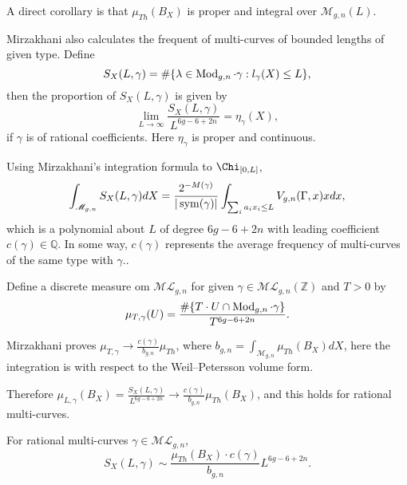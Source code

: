 A direct corollary is that $\mu_{Th}(B_X)$ is proper and  integral over $\mathscr{M}_{g,n}(L)$.

Mirzakhani also calculates the frequent of multi-curves  of bounded  lengths of given type. Define 
$$
S_X(L,\gamma)=\#\{\lambda\in \operatorname{Mod}_{g,n}\cdot \gamma:l_\gamma(X)\leq L\},
$$
then the proportion  of $S_X(L,\gamma)$ is given by 
 $$
\lim_{L\to \infty} \frac{S_X(L,\gamma)}{L^{6g-6+2n}}=\eta_\gamma(X),
$$
if $\gamma$ is of rational coefficients. Here $\eta_\gamma$ is proper and continuous.

Using Mirzakhani’s integration formula  to  $\Chi_{[0,L]}$, 
$$
\int_{\mathscr{M}_{g,n}}S_X(L,\gamma)dX=\frac{2^{-M(\gamma)}}{|\operatorname{sym}(\gamma)|}\int_{\sum_{i}a_ix_i\leq L}V_{g,n}(\Gamma,x)xdx,
$$
 which is a polynomial  about $L$ of degree $6g-6+2n$ with leading coefficient $c(\gamma)\in\mathbb{Q}$. In some way, $c(\gamma)$ represents the average frequency of multi-curves of the same type with $\gamma$..
 
 Define a discrete measure om $\mathscr{ML}_{g,n}$ for given $\gamma\in \mathscr{ML}_{g,n}(\mathbb{Z})$ and $T>0$ by 
 $$
 \mu_{T,\gamma}(U)=\frac{\#\{T\cdot U\cap \operatorname{Mod}_{g,n}\cdot \gamma \}}{T^{6g-6+2n}}.
 $$

Mirzakhani proves $\mu_{T,\gamma}\to \frac{c(\gamma)}{b_{g,n}}\mu_{Th}$, where $b_{g,n}=\int_{\mathscr{M}_{g,n}}\mu_{Th}(B_X)dX$, here the integration is with respect to the Weil--Petersson volume form.

Therefore $\mu_{L,\gamma}(B_X)=\frac{S_X(L,\gamma)}{L^{6g-6+2n}}\to \frac{c(\gamma)}{b_{g,n}}\mu_{Th}(B_X)$, and this holds for rational multi-curves.

\begin{thma}
For rational multi-curves $\gamma\in \mathscr{ML}_{g,n}$, $$
S_X(L,\gamma)\sim \frac{\mu_{Th}(B_X)\cdot c(\gamma)}{b_{g,n}} L^{6g-6+2n}.
$$
\end{thma}
